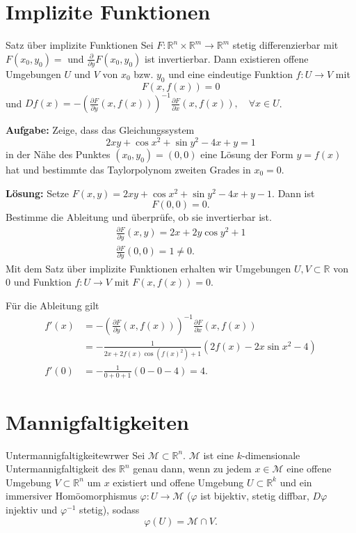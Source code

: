 \documentclass[a4paper, landscape,twocolumn,fontsize=9pt]{scrartcl}
\begin{document}
\section{Implizite Funktionen}
\begin{theorem}{Satz über implizite Funktionen}{}
	Sei $F: \mathbb R^n \times \mathbb R^m \to \mathbb R^m$ stetig differenzierbar mit $F(x_0,y_0) =$ und $\frac{\partial}{\partial y} F(x_0,y_0)$ ist invertierbar. Dann existieren offene Umgebungen $U$ und $V$ von $x_0$ bzw. $y_0$ und eine eindeutige Funktion $f: U \to V$ mit 
	\[
		F(x, f(x)) = 0
	\]	
	und $Df(x) = - (\frac{\partial F}{\partial y}(x,f(x)))^{-1} \frac{\partial F}{\partial x}(x,f(x)), \quad \forall x \in U$. 
\end{theorem}

\textbf{Aufgabe:} Zeige, dass das Gleichungssystem 
\[
	2xy + \cos x^2 + \sin y^2 -4x + y = 1
\]
in der Nähe des Punktes $(x_0,y_0) = (0,0)$ eine Lösung der Form $y = f(x)$ hat und bestimmte das Taylorpolynom zweiten Grades in $x_0 = 0$.

\textbf{Lösung:} Setze $F(x,y) = 2xy + \cos x^2 + \sin y^2 - 4x + y -1$. Dann ist $$F(0,0) = 0.$$ Bestimme die Ableitung und überprüfe, ob sie invertierbar ist.
\begin{align*}
	\frac{\partial F}{\partial y}(x,y) = 2x + 2y \cos y^2 + 1 \\
	\frac{\partial F}{\partial y}(0,0) = 1 \neq 0.
\end{align*}
Mit dem Satz über implizite Funktionen erhalten wir Umgebungen $U, V \subset \mathbb R$ von $0$ und Funktion $f: U \to V$ mit $F(x, f(x)) = 0$.

Für die Ableitung gilt
\begin{align*}
	f'(x) &= - (\frac{\partial F}{\partial y}(x,f(x)))^{-1} \frac{\partial F}{\partial x}(x,f(x)) \\
		  &= - \frac{1}{2x + 2f(x) \cos(f(x)^2) + 1}(2f(x) - 2x \sin x^2 -4) \\
	f'(0) &= -\frac{1}{0+0+1}(0 - 0 - 4) = 4.
\end{align*}

\section{Mannigfaltigkeiten}
\begin{definition}{Untermannigfaltigkeit}{ewrwer}
	Sei $\mathcal M \subset \mathbb R^n$. $\mathcal M$ ist eine $k$-dimensionale Untermannigfaltigkeit des $\mathbb R^n$ genau dann, wenn zu jedem $x \in \mathcal M$ eine offene Umgebung $V \subset \mathbb R^n$ um $x$ existiert und offene Umgebung $U \subset \mathbb R^k$ und ein immersiver Homöomorphismus $\varphi: U \to \mathcal M$ ($\varphi$ ist bijektiv, stetig diffbar, $D\varphi$ injektiv und $\varphi^{-1}$ stetig), sodass
	\[
		\varphi(U) = \mathcal M \cap V.
	\]
\end{definition}
\end{document}
